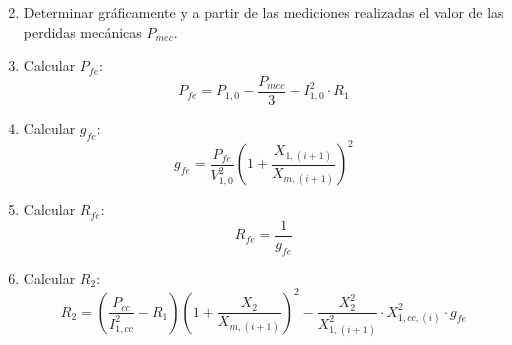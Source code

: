 \documentclass[11pt,letterpaper]{article}     %
\begin{document}
\begin{enumerate}
\begin{equation}
	\end{equation}
	\item Determinar gráficamente y a partir de las mediciones realizadas el valor de las perdidas mecánicas $P_{mec}$.
	\item Calcular $P_{fe}$:
	\begin{equation}
		P_{fe} = P_{1,0}-\frac{P_{mec}}{3}-I_{1,0}^{2}\cdot R_{1} \label{Pfe}
	\end{equation}
	\item Calcular $g_{fe}$:
	\begin{equation}
		g_{fe} = \frac{P_{fe}}{V_{1,0}^{2}}\left(1+\frac{X_{1,(i+1)}}{X_{m,(i+1)}}\right)^{2} \label{gfeequ}
	\end{equation} 
	\item Calcular $R_{fe}$:
	\begin{equation}
	R_{fe} = \frac{1}{g_{fe}} \label{Rfe}
	\end{equation}
	\item Calcular $R_{2}$:
	\begin{equation}
		R_{2} = \left(\frac{P_{cc}}{I_{1,cc}^{2}}-R_{1}\right)\left(1+\frac{X_{2}}{X_{m,(i+1)}}\right)^{2}-\frac{X_{2}^{2}}{X_{1,(i+1)}^{2}}\cdot X_{1,cc,(i)}^{2}\cdot g_{fe} \label{R2equ}
	\end{equation}
\end{enumerate}
\end{document}
